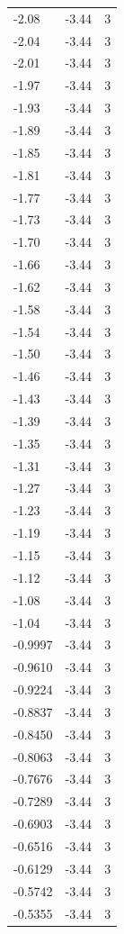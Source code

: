 \begin{longtable}{lrr}
  -2.08 & -3.44 & 3 \\
  -2.04 & -3.44 & 3 \\
  -2.01 & -3.44 & 3 \\
  -1.97 & -3.44 & 3 \\
  -1.93 & -3.44 & 3 \\
  -1.89 & -3.44 & 3 \\
  -1.85 & -3.44 & 3 \\
  -1.81 & -3.44 & 3 \\
  -1.77 & -3.44 & 3 \\
  -1.73 & -3.44 & 3 \\
  -1.70 & -3.44 & 3 \\
  -1.66 & -3.44 & 3 \\
  -1.62 & -3.44 & 3 \\
  -1.58 & -3.44 & 3 \\
  -1.54 & -3.44 & 3 \\
  -1.50 & -3.44 & 3 \\
  -1.46 & -3.44 & 3 \\
  -1.43 & -3.44 & 3 \\
  -1.39 & -3.44 & 3 \\
  -1.35 & -3.44 & 3 \\
  -1.31 & -3.44 & 3 \\
  -1.27 & -3.44 & 3 \\
  -1.23 & -3.44 & 3 \\
  -1.19 & -3.44 & 3 \\
  -1.15 & -3.44 & 3 \\
  -1.12 & -3.44 & 3 \\
  -1.08 & -3.44 & 3 \\
  -1.04 & -3.44 & 3 \\
  -0.9997 & -3.44 & 3 \\
  -0.9610 & -3.44 & 3 \\
  -0.9224 & -3.44 & 3 \\
  -0.8837 & -3.44 & 3 \\
  -0.8450 & -3.44 & 3 \\
  -0.8063 & -3.44 & 3 \\
  -0.7676 & -3.44 & 3 \\
  -0.7289 & -3.44 & 3 \\
  -0.6903 & -3.44 & 3 \\
  -0.6516 & -3.44 & 3 \\
  -0.6129 & -3.44 & 3 \\
  -0.5742 & -3.44 & 3 \\
  -0.5355 & -3.44 & 3 \\

\end{longtable}

